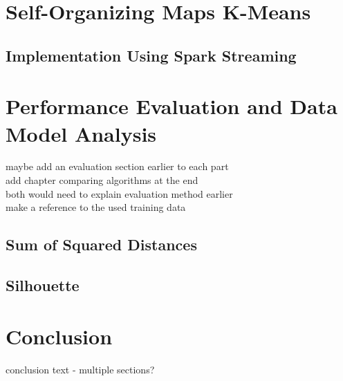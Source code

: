 \documentclass{l4proj}
\begin{document}

\chapter{Self-Organizing Maps K-Means}
\label{som}

\section{Implementation Using Spark Streaming}


\chapter{Performance Evaluation and Data Model Analysis}
\label{eval}

maybe add an evaluation section earlier to each part\\
add chapter comparing algorithms at the end\\
both would need to explain evaluation method earlier\\
make a reference to the used training data

\section{Sum of Squared Distances}

\section{Silhouette}


\chapter{Conclusion}
\label{conclusion}

conclusion text - multiple sections?




\end{document}
